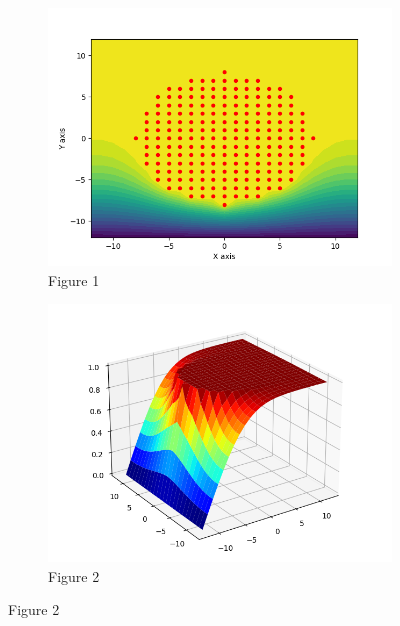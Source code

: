 \documentclass[12pt, a4paper]{report}
\begin{document}
\begin{figure}[h!]

\begin{subfigure}{0.55\textwidth}
    \centering
    \includegraphics[scale=0.9,width=\linewidth]{fig1.png} 
    \caption{Figure 1}
    \label{fig:my_label}
\end{subfigure}
\begin{subfigure}{0.55\textwidth}
    \centering
    \includegraphics[scale=0.9,width=\linewidth]{fig5.png} 
    \caption{Figure 2}
    \label{fig:image2}
\end{subfigure}


\end{figure}
\end{document}
